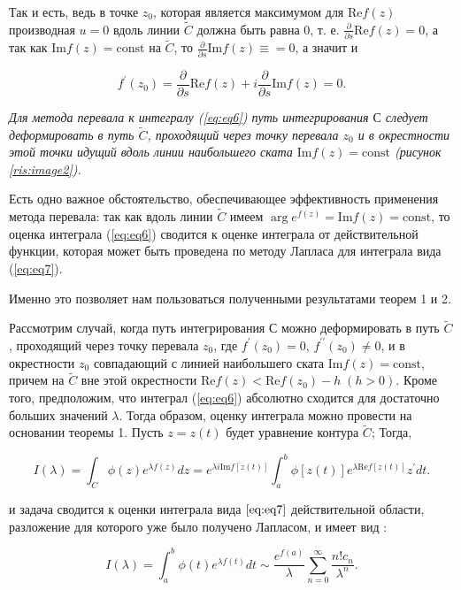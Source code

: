 \documentclass[14pt, a4paper]{article}
\numberwithin{figure}{section}
\numberwithin{equation}{section}
\renewcommand{\Re}{\mathrm{Re}}
\renewcommand{\Im}{\mathrm{Im}}
\newcommand{\const}{\mathrm{const}}
\begin{document}
Так и есть, ведь в точке $z_0$, которая является максимумом для $\Re f (z)$ производная $u=0$ вдоль линии $\widetilde{C}$ должна быть равна 0, т. е. $\frac{\partial}{\partial s}\Re f(z)=0$, а так как $\Im f(z) = \const$ на $\widetilde{C}$, то $\frac{\partial}{\partial s} \Im f(z) \equiv = 0$, а значит и 

$$
f^\prime(z_0) = \frac{\partial}{\partial s} \Re f(z) + i\frac{\partial}{\partial s} \Im f(z) = 0.
$$ 

\textit{Для метода перевала к интегралу (\ref{eq:eq6}) путь интегрирования $С$ следует деформировать в путь $\widetilde{C}$, проходящий через точку перевала $z_0$ и в окрестности этой точки идущий вдоль линии наибольшего ската $\Im f(z) = \const$ (рисунок \ref{ris:image2}).}

Есть одно важное обстоятельство, обеспечивающее эффективность применения метода перевала: так как вдоль линии $\widetilde{C}$ имеем $\arg e^{f(z)} = \Im f(z) = \const$, то оценка интеграла (\ref{eq:eq6}) сводится к оценке интеграла от действительной функции, которая может быть проведена по методу Лапласа для интеграла вида (\ref{eq:eq7}).  \cite{Fedoryuk}

Именно это позволяет нам пользоваться полученными результатами теорем 1 и 2. 

Рассмотрим  случай, когда путь интегрирования $С$ можно деформировать в путь $\widetilde{C}$, проходящий через точку перевала $z_0$, где $f^\prime(z_0) = 0$, $f^{\prime\prime}(z_0)\neq0$, и в окрестности $z_0$ совпадающий с линией наибольшего ската $\Im f(z) = \const$, причем на $\widetilde{C}$ вне этой окрестности $\Re f(z) < \Re f(z_0) - h \;(h> 0)$. Кроме того, предположим, что интеграл (\ref{eq:eq6}) абсолютно сходится для достаточно больших значений $\lambda$.
Тогда образом, оценку интеграла можно провести на основании теоремы 1. Пусть $z = z(t)$ будет уравнение контура $\widetilde{C}$; Тогда,

\begin{equation}\label{eq:eq11}
I(\lambda) = \int_{C}^{}\phi(z) e^{\lambda f(z)}dz=e^{\lambda i \Im f[z(t)]}\int_{a}^{b}\phi[z(t)]e^{\lambda \Re f[z(t)]}z^{\prime} dt.
\end{equation}

и задача сводится к оценки интеграла вида $\ref{eq:eq7}$ действительной области, разложение для которого уже было получено Лапласом, и имеет вид \cite{Wong}:

$$
I(\lambda) = \int_{a}^{b}\phi(t)e^{\lambda f(t)}dt \sim \frac{e^{f(a)}}{\lambda}\sum_{n=0}^{\infty}\frac{n! c_n}{\lambda^n}.
$$
\end{document}
